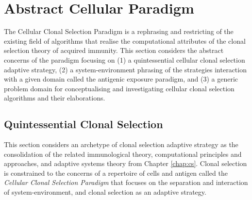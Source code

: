 %
%
\section{Abstract Cellular Paradigm}
\label{sec:cells:paradigm}
The Cellular Clonal Selection Paradigm is a rephrasing and restricting of the existing field of algorithms that realise the computational attributes of the clonal selection theory of acquired immunity. This section considers the abstract concerns of the paradigm focusing on (1) a quintessential cellular clonal selection adaptive strategy, (2) a system-environment phrasing of the strategies interaction with a given domain called the antigenic exposure paradigm, and (3) a generic problem domain for conceptualising and investigating cellular clonal selection algorithms and their elaborations.

%
%
\subsection{Quintessential Clonal Selection}
\label{subsec:cells:paradigm:clonalselection}
This section considers an archetype of clonal selection adaptive strategy as the consolidation of the related immunological theory, computational principles and approaches, and adaptive systems theory from Chapter \ref{chap:cs}. Clonal selection is constrained to the concerns of a repertoire of cells and antigen called the \emph{Cellular Clonal Selection Paradigm} that focuses on the separation and interaction of system-environment, and clonal selection as an adaptive strategy. 

%
%
